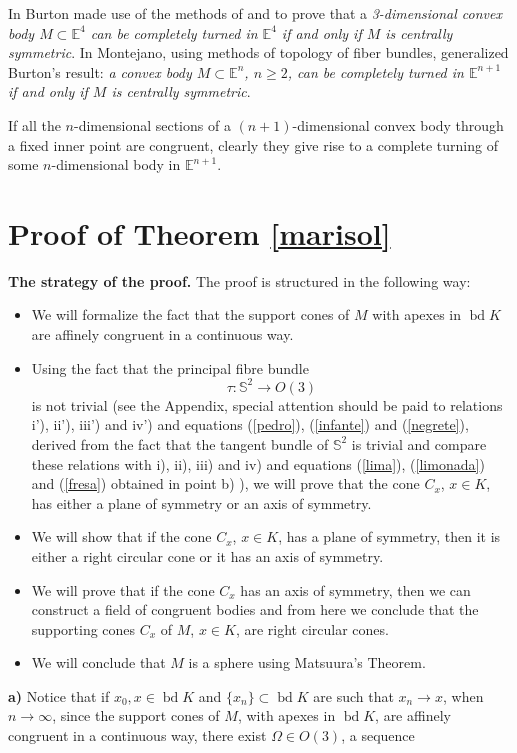 \documentclass[12pt]{amsart}
\newcommand{\bd}{\operatorname*{bd}}
\begin{document}
In \cite{burton} Burton made use of the methods of \cite{had} and \cite{mani} to prove that a \textit{3-dimensional convex body $M\subset \mathbb{E}^{4}$ can be completely turned in $\mathbb{E}^{4}$ if and only if $M$ is centrally symmetric}. In \cite{monte} Montejano, using methods of topology of fiber bundles,  generalized Burton's result: \textit{a convex body $M\subset \mathbb{E}^{n}$, $n \geq 2$, can be completely turned in $\mathbb{E}^{n+1}$ if and only if $M$ is centrally symmetric}. 

If all the $n$-dimensional sections of a $(n+1)$-dimensional convex body through a fixed inner point are congruent, clearly they give rise to a complete turning of some $n$-dimensional body in $\mathbb{E}^{n+1}$.
 
       
\section{Proof of Theorem \ref{marisol}}
  \textbf{The strategy of the proof.} The proof is structured in the following way:
\begin{itemize}
\item [a)] We will formalize the fact that the support cones of $M$ with apexes in $\bd K$ are affinely congruent in a continuous way.
\item [b)] Using the fact that the principal fibre bundle $$\tau: \mathbb{S}^2 \rightarrow O(3)$$ is not trivial (see the Appendix, special attention should be paid to relations i'), ii'), iii') and iv') and equations (\ref{pedro}), (\ref{infante}) and (\ref{negrete}), derived from the fact that the tangent bundle of $\mathbb{S}^2$ is trivial and compare these relations with i), ii), iii) and iv) and equations (\ref{lima}), (\ref{limonada}) and (\ref{fresa}) obtained in point b) ), we will prove that the cone $C_x$, $x\in K$, has either a plane of symmetry or an axis of symmetry.  
\item [c)] We will show that if the cone $C_x$, $x\in K$, has a plane of symmetry, then it is either a right circular cone or it has an axis of symmetry.
\item [d)] We will prove that if the cone $C_x$ has an axis of symmetry, then we can construct a field of congruent bodies and from here we conclude that the supporting cones $C_x$ of $M$, $x\in K$, are right circular cones. 
\item [e)] We will conclude that $M$ is a sphere using Matsuura's Theorem.
\end{itemize}
\textbf{a)} Notice that if $x_0,x\in \bd K$ and $\{x_n\} \subset \bd K$ are such that $x_n\rightarrow x$, when $n \rightarrow \infty$, since the support cones of $M$, with apexes in $\bd K$, are affinely congruent in a continuous way, there exist $\Omega \in O(3)$, a sequence 
\end{document}
